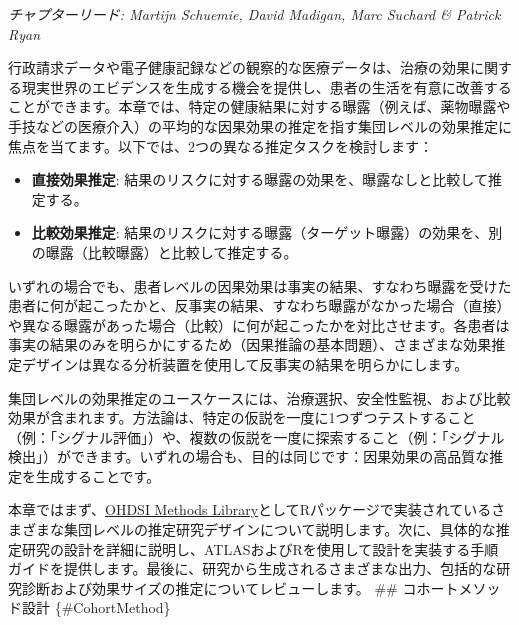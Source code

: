 \documentclass[
  11pt]{book}
\providecommand{\tightlist}{%
  \setlength{\itemsep}{0pt}\setlength{\parskip}{0pt}}
\theoremstyle{definition}
\theoremstyle{definition}
\theoremstyle{definition}
\theoremstyle{definition}
\theoremstyle{remark}
\begin{document}
\emph{チャプターリード: Martijn Schuemie, David Madigan, Marc Suchard \& Patrick Ryan}


行政請求データや電子健康記録などの観察的な医療データは、治療の効果に関する現実世界のエビデンスを生成する機会を提供し、患者の生活を有意に改善することができます。本章では、特定の健康結果に対する曝露（例えば、薬物曝露や手技などの医療介入）の平均的な因果効果の推定を指す集団レベルの効果推定に焦点を当てます。以下では、2つの異なる推定タスクを検討します：

\begin{itemize}
\tightlist
\item
  \textbf{直接効果推定}: 結果のリスクに対する曝露の効果を、曝露なしと比較して推定する。 
\item
  \textbf{比較効果推定}: 結果のリスクに対する曝露（ターゲット曝露）の効果を、別の曝露（比較曝露）と比較して推定する。 
\end{itemize}

いずれの場合でも、患者レベルの因果効果は事実の結果、すなわち曝露を受けた患者に何が起こったかと、反事実の結果、すなわち曝露がなかった場合（直接）や異なる曝露があった場合（比較）に何が起こったかを対比させます。各患者は事実の結果のみを明らかにするため（因果推論の基本問題）、さまざまな効果推定デザインは異なる分析装置を使用して反事実の結果を明らかにします。 

集団レベルの効果推定のユースケースには、治療選択、安全性監視、および比較効果が含まれます。方法論は、特定の仮説を一度に1つずつテストすること（例：「シグナル評価」）や、複数の仮説を一度に探索すること（例：「シグナル検出」）ができます。いずれの場合も、目的は同じです：因果効果の高品質な推定を生成することです。  

本章ではまず、\href{https://ohdsi.github.io/MethodsLibrary/}{OHDSI Methods Library}としてRパッケージで実装されているさまざまな集団レベルの推定研究デザインについて説明します。次に、具体的な推定研究の設計を詳細に説明し、ATLASおよびRを使用して設計を実装する手順ガイドを提供します。最後に、研究から生成されるさまざまな出力、包括的な研究診断および効果サイズの推定についてレビューします。
\#\# コホートメソッド設計 \{\#CohortMethod\}

\end{document}

